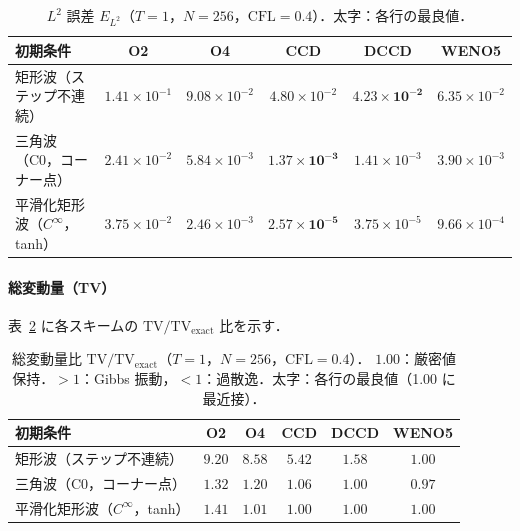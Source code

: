 \begin{table}[htbp]
  \centering
  \caption{%
    $L^2$ 誤差 $E_{L^2}$（$T=1$，$N=256$，$\mathrm{CFL}=0.4$）．太字：各行の最良値．
  }
  \label{tab:dccd_l2}
  \begin{tabular}{lccccc}
    \toprule
    初期条件 & O2 & O4 & CCD & DCCD & WENO5 \\
    \midrule
    矩形波（ステップ不連続）
      & $1.41 \times 10^{-1}$
      & $9.08 \times 10^{-2}$
      & $4.80 \times 10^{-2}$
      & $\mathbf{4.23 \times 10^{-2}}$
      & $6.35 \times 10^{-2}$ \\
    三角波（C0，コーナー点）
      & $2.41 \times 10^{-2}$
      & $5.84 \times 10^{-3}$
      & $\mathbf{1.37 \times 10^{-3}}$
      & $1.41 \times 10^{-3}$
      & $3.90 \times 10^{-3}$ \\
    平滑化矩形波（$C^\infty$，tanh）
      & $3.75 \times 10^{-2}$
      & $2.46 \times 10^{-3}$
      & $\mathbf{2.57 \times 10^{-5}}$
      & $3.75 \times 10^{-5}$
      & $9.66 \times 10^{-4}$ \\
    \bottomrule
  \end{tabular}
\end{table}

\paragraph{総変動量（TV）}
表~\ref{tab:dccd_tv} に各スキームの $\mathrm{TV}/\mathrm{TV}_{\mathrm{exact}}$ 比を示す．

\begin{table}[htbp]
  \centering
  \caption{%
    総変動量比 $\mathrm{TV}/\mathrm{TV}_{\mathrm{exact}}$（$T=1$，$N=256$，$\mathrm{CFL}=0.4$）．
    $1.00$：厳密値保持．$>1$：Gibbs 振動，$<1$：過散逸．太字：各行の最良値（1.00 に最近接）．
  }
  \label{tab:dccd_tv}
  \begin{tabular}{lccccc}
    \toprule
    初期条件 & O2 & O4 & CCD & DCCD & WENO5 \\
    \midrule
    矩形波（ステップ不連続）
      & $9.20$
      & $8.58$
      & $5.42$
      & $1.58$
      & $\mathbf{1.00}$ \\
    三角波（C0，コーナー点）
      & $1.32$
      & $1.20$
      & $1.06$
      & $\mathbf{1.00}$
      & $0.97$ \\
    平滑化矩形波（$C^\infty$，tanh）
      & $1.41$
      & $1.01$
      & $\mathbf{1.00}$
      & $\mathbf{1.00}$
      & $\mathbf{1.00}$ \\
    \bottomrule
  \end{tabular}
\end{table}

